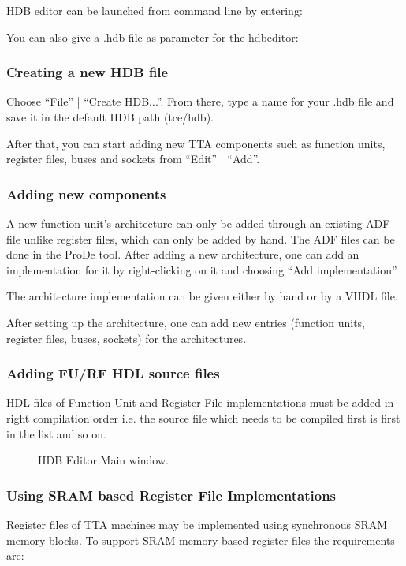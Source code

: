 \documentclass[twoside]{tceusermanual}
\begin{document}
HDB editor can be launched from command line by entering:


You can also give a .hdb-file as parameter for the hdbeditor:


\subsubsection{Creating a new HDB file}

Choose ``File'' | ``Create HDB...''. 
From there, type a name for your .hdb file and save it in the default HDB path
(tce/hdb).

After that, you can start adding new TTA components such as function units,
register files, buses and sockets from ``Edit'' | ``Add''.

\subsubsection{Adding new components}
A new function unit's architecture can only be added through an existing ADF
file unlike register files, which can only be added by hand. The ADF files
can be done in the ProDe tool. After adding a new architecture, one can add an
implementation for it by right-clicking on it and choosing ``Add
implementation''

The architecture implementation can be given either by hand or by a VHDL file.

After setting up the architecture, one can add new entries (function units,
register files, buses, sockets) for the architectures.

\subsubsection{Adding FU/RF HDL source files}
HDL files of Function Unit and Register File implementations must be added in
right compilation order i.e. the source file which needs to be compiled first
is first in the list and so on.

\begin{figure}[tb]
\centerline{}
\caption{HDB Editor Main window.}
\label{fig:hdbeditor_main_window}
\end{figure}

\subsubsection{Using SRAM based Register File Implementations}
Register files of TTA machines may be implemented using synchronous
SRAM memory blocks. To support SRAM memory based register files the
requirements are:
\end{document}
